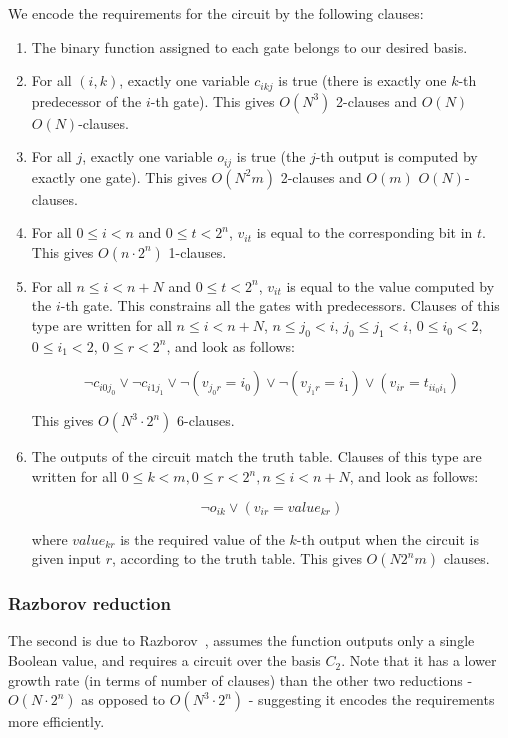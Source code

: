 \documentclass{article}
\begin{document}
We encode the requirements for the circuit by the following clauses:

\begin{enumerate}

  \item The binary function assigned to each gate belongs to our desired basis.
  \item For all $(i,k)$, exactly one variable $c_{ikj}$ is true (there is exactly one $k$-th predecessor of the $i$-th gate). This gives $O(N^3)$ 2-clauses and $O(N)$ $O(N)$-clauses.
  \item For all $j$, exactly one variable $o_{ij}$ is true (the $j$-th output is computed by exactly one gate). This gives $O(N^2m)$ 2-clauses and $O(m)$ $O(N)$-clauses.
  \item For all $0 \leq i < n$ and $0 \leq t < 2^n$, $v_{it}$ is equal to the corresponding bit in $t$. This gives $O(n \cdot 2^n)$ 1-clauses.
  \item For all $n \leq i < n + N$ and $0 \leq t < 2^n$, $v_{it}$ is equal to the value computed by the $i$-th gate. This constrains all the gates with predecessors. Clauses of this type are written for all $n \leq i < n + N$, $n \leq j_0 < i$, $j_0 \leq j_1 < i$, $0 \leq i_0 < 2$, $0 \leq i_1 < 2$, $0 \leq r < 2^n$, and look as follows: 

  \[
    \neg c_{i0j_0} \lor \neg c_{i1j_1} \lor \neg(v_{j_0r} = i_0) \lor \neg(v_{j_1r} = i_1) \lor (v_{ir} = t_{ii_0i_1})
  \]

  This gives $O(N^3 \cdot 2^n)$ 6-clauses.
  \item The outputs of the circuit match the truth table. Clauses of this type are written for all $0 \leq k < m, 0 \leq r < 2^n, n \leq i < n + N$, and look as follows:
 
  \[
    \neg o_{ik} \lor (v_{ir} = value_{kr})
  \] 

  where $value_{kr}$ is the required value of the $k$-th output when the circuit is given input $r$, according to the truth table. This gives $O(N2^nm)$ clauses.

\end{enumerate}


\subsubsection{Razborov reduction}

The second is due to Razborov~\cite{raz}, assumes the function outputs only a single Boolean value, and requires a circuit over the basis \(C_2\). Note that it has a lower growth rate (in terms of number of clauses) than the other two reductions - $O(N \cdot 2^n)$ as opposed to $O(N^3 \cdot 2^n)$ - suggesting it encodes the requirements more efficiently.
\end{document}
